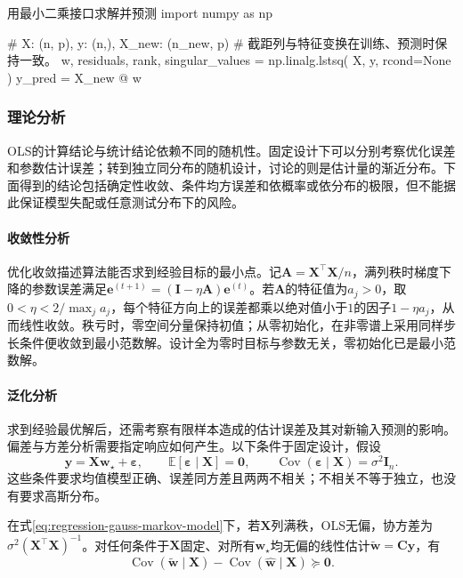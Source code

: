 \begin{codeblock}[language=Python,label={code:regression-ols},unbreakable]{用最小二乘接口求解并预测}
import numpy as np

# X: (n, p), y: (n,), X_new: (n_new, p)
# 截距列与特征变换在训练、预测时保持一致。
w, residuals, rank, singular_values = np.linalg.lstsq(
    X, y, rcond=None
)
y_pred = X_new @ w
\end{codeblock}

\subsubsection{理论分析}
\label{sec:regression-ols-theory}

OLS的计算结论与统计结论依赖不同的随机性。固定设计下可以分别考察优化误差和参数估计误差；转到独立同分布的随机设计，讨论的则是估计量的渐近分布。下面得到的结论包括确定性收敛、条件均方误差和依概率或依分布的极限，但不能据此保证模型失配或任意测试分布下的风险。

\paragraph{收敛性分析}
优化收敛描述算法能否求到经验目标的最小点。记$\bm{A}=\bm{X}^{\top}\bm{X}/n$，满列秩时梯度下降的参数误差满足$\bm{e}^{(t+1)}=(\bm{I}-\eta\bm{A})\bm{e}^{(t)}$。若$\bm{A}$的特征值为$a_j>0$，取$0<\eta<2/\max_j a_j$，每个特征方向上的误差都乘以绝对值小于$1$的因子$1-\eta a_j$，从而线性收敛。秩亏时，零空间分量保持初值；从零初始化，在非零谱上采用同样步长条件便收敛到最小范数解。设计全为零时目标与参数无关，零初始化已是最小范数解。

\paragraph{泛化分析}
求到经验最优解后，还需考察有限样本造成的估计误差及其对新输入预测的影响。偏差与方差分析需要指定响应如何产生。以下条件于固定设计，假设
\begin{equation}
  \bm{y}=\bm{X}\bm{w}_{\star}+\bm{\varepsilon},\qquad
  \mathbb{E}[\bm{\varepsilon}\mid\bm{X}]=\bm{0},\qquad
  \operatorname{Cov}(\bm{\varepsilon}\mid\bm{X})=\sigma^2\bm{I}_n.
  \label{eq:regression-gauss-markov-model}
\end{equation}
这些条件要求均值模型正确、误差同方差且两两不相关；不相关不等于独立，也没有要求高斯分布。

\begin{theorem}
  \label{thm:regression-gauss-markov}
  在式\eqref{eq:regression-gauss-markov-model}下，若$\bm{X}$列满秩，OLS无偏，协方差为$\sigma^2(\bm{X}^{\top}\bm{X})^{-1}$。对任何条件于$\bm{X}$固定、对所有$\bm{w}_{\star}$均无偏的线性估计$\widetilde{\bm{w}}=\bm{C}\bm{y}$，有
  \[
    \operatorname{Cov}(\widetilde{\bm{w}}\mid\bm{X})
    -\operatorname{Cov}(\widehat{\bm{w}}\mid\bm{X})\succeq\bm{0}.
  \]
\end{theorem}

